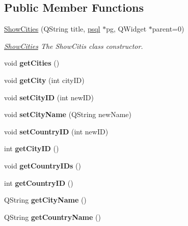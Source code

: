 \subsection*{Public Member Functions}
\begin{DoxyCompactItemize}
\item 
\hyperlink{class_show_cities_a71a514390bebd22b5e6ecbb6b731979a}{Show\+Cities} (Q\+String title, \hyperlink{classpsql}{psql} $\ast$pg, Q\+Widget $\ast$parent=0)
\begin{DoxyCompactList}\small\item\em \hyperlink{class_show_cities}{Show\+Cities} The Show\+Citis class constructor. \end{DoxyCompactList}\item 
\mbox{\label{class_show_cities_a8026675035c0bce6dab846262e1da0c5}} 
void {\bfseries get\+Cities} ()
\item 
\mbox{\label{class_show_cities_a7a03bcd5374073d6689aed90cc23ce5e}} 
void {\bfseries get\+City} (int city\+ID)
\item 
\mbox{\label{class_show_cities_acd17480ad6a64e989e9aa0b07d30141b}} 
void {\bfseries set\+City\+ID} (int new\+ID)
\item 
\mbox{\label{class_show_cities_acadd6c1bdb26d30e796bab4b5b2acfd9}} 
void {\bfseries set\+City\+Name} (Q\+String new\+Name)
\item 
\mbox{\label{class_show_cities_a853a958ebc2c0d42d872c237d431fe25}} 
void {\bfseries set\+Country\+ID} (int new\+ID)
\item 
\mbox{\label{class_show_cities_ac81b38d6862643619d07f82fe12b5c02}} 
int {\bfseries get\+City\+ID} ()
\item 
\mbox{\label{class_show_cities_a8fa42e8a5b12579cd04ae2a8ee4a9370}} 
void {\bfseries get\+Country\+I\+Ds} ()
\item 
\mbox{\label{class_show_cities_a8f66380734928e926a732a0088c1d998}} 
int {\bfseries get\+Country\+ID} ()
\item 
\mbox{\label{class_show_cities_a3640b91c66939d0070c3dd6f5b9eb93c}} 
Q\+String {\bfseries get\+City\+Name} ()
\item 
\mbox{\label{class_show_cities_a93cf32e7ef19a182d0022c9c888392aa}} 
Q\+String {\bfseries get\+Country\+Name} ()
\end{DoxyCompactItemize}


